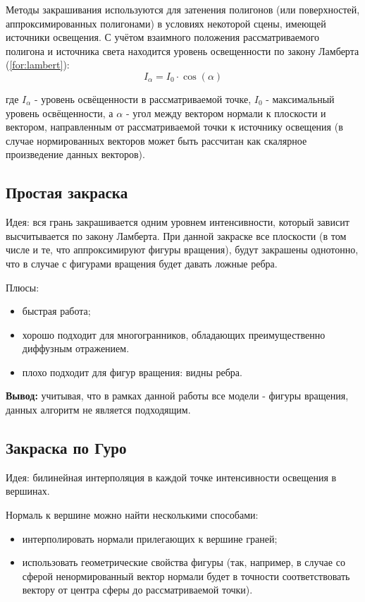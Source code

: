 Методы закрашивания используются для затенения полигонов (или поверхностей, аппроксимированных полигонами) в условиях некоторой сцены, имеющей источники освещения. С учётом взаимного положения рассматриваемого полигона и источника света находится уровень освещенности по закону Ламберта (\ref{for:lambert}):
\begin{equation}
    \label{for:lambert}
    I_{\alpha} = I_0 \cdot \cos{(\alpha)}
\end{equation}

где $I_{\alpha}$ - уровень освёщенности в рассматриваемой точке, $I_0$ - максимальный уровень освёщенности, а $\alpha$ - угол между вектором нормали к плоскости и вектором, направленным от рассматриваемой точки к источнику освещения (в случае нормированных векторов может быть рассчитан как скалярное произведение данных векторов).

\subsection{Простая закраска}

Идея: вся грань закрашивается одним уровнем интенсивности, который зависит высчитывается по закону Ламберта. При данной закраске все плоскости (в том числе и те, что аппроксимируют фигуры вращения), будут закрашены однотонно, что в случае с фигурами вращения будет давать ложные ребра.

Плюсы:
\begin{itemize}
    \item быстрая работа;
    \item хорошо подходит для многогранников, обладающих преимущественно диффузным отражением.
\end{itemize}

\begin{itemize}
    \item плохо подходит для фигур вращения: видны ребра.
\end{itemize}

\textbf{Вывод:} учитывая, что в рамках данной работы все модели - фигуры вращения, данных алгоритм не является подходящим.

\subsection{Закраска по Гуро}
Идея: билинейная интерполяция в каждой точке интенсивности освещения в вершинах.

Нормаль к вершине можно найти несколькими способами:
\begin{itemize}
    \item интерполировать нормали прилегающих к вершине граней;
    \item использовать геометрические свойства фигуры (так, например, в случае со сферой ненормированный вектор нормали будет в точности соответствовать вектору от центра сферы до рассматриваемой точки).
\end{itemize}

